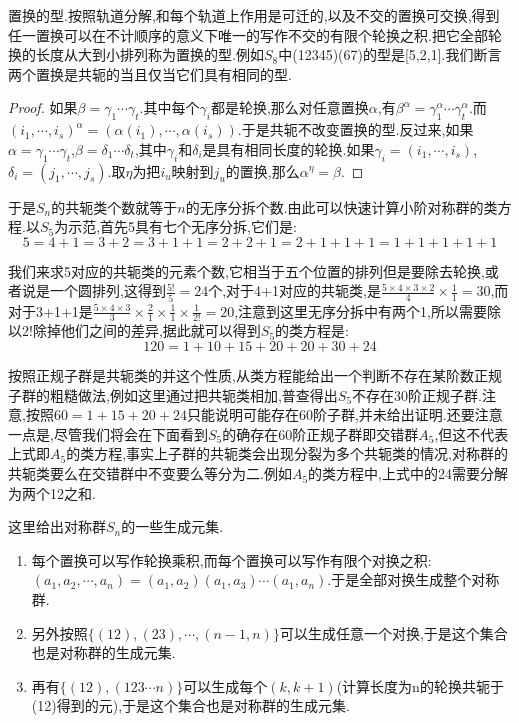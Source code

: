 置换的型.按照轨道分解,和每个轨道上作用是可迁的,以及不交的置换可交换,得到任一置换可以在不计顺序的意义下唯一的写作不交的有限个轮换之积.把它全部轮换的长度从大到小排列称为置换的型.例如$S_8$中(12345)(67)的型是[5,2,1].我们断言两个置换是共轭的当且仅当它们具有相同的型.
\begin{proof}
	
	如果$\beta=\gamma_1\cdots\gamma_t$.其中每个$\gamma_i$都是轮换,那么对任意置换$\alpha$,有$\beta^ {\alpha}=\gamma_1^{\alpha}\cdots\gamma_t^{\alpha}$.而$(i_1,\cdots,i_s)^{\alpha}=(\alpha(i_1),\cdots,\alpha(i_s))$.于是共轭不改变置换的型.反过来,如果$\alpha=\gamma_1\cdots \gamma_t$,$\beta=\delta_1\cdots\delta_t$,其中$\gamma_i$和$\delta_i$是具有相同长度的轮换.如果$\gamma_i= (i_1,\cdots,i_s)$,$\delta_i=(j_1,\cdots,j_s)$.取$\eta$为把$i_u$映射到$j_u$的置换,那么$\alpha^{\eta}=\beta$.
\end{proof}

于是$S_n$的共轭类个数就等于$n$的无序分拆个数.由此可以快速计算小阶对称群的类方程.以$S_5$为示范,首先5具有七个无序分拆,它们是:
$$5=4+1=3+2=3+1+1=2+2+1=2+1+1+1=1+1+1+1+1$$

我们来求5对应的共轭类的元素个数,它相当于五个位置的排列但是要除去轮换,或者说是一个圆排列,这得到$\frac{5!}{5}=24$个,对于4+1对应的共轭类,是$\frac{5\times 4\times 3\times 2}{4}\times\frac{1}{1}=30$,而对于3+1+1是$\frac{5\times 4\times 3}{3}\times\frac{2}{1}\times\frac{1}{1}\times\frac{1}{2!}=20$,注意到这里无序分拆中有两个1,所以需要除以$2!$除掉他们之间的差异,据此就可以得到$S_5$的类方程是:
$$120=1+10+15+20+20+30+24$$

按照正规子群是共轭类的并这个性质,从类方程能给出一个判断不存在某阶数正规子群的粗糙做法,例如这里通过把共轭类相加,普查得出$S_5$不存在30阶正规子群.注意,按照$60=1+15+20+24$只能说明可能存在60阶子群,并未给出证明.还要注意一点是,尽管我们将会在下面看到$S_5$的确存在60阶正规子群即交错群$A_5$,但这不代表上式即$A_5$的类方程,事实上子群的共轭类会出现分裂为多个共轭类的情况,对称群的共轭类要么在交错群中不变要么等分为二.例如$A_5$的类方程中,上式中的24需要分解为两个12之和.

这里给出对称群$S_n$的一些生成元集.
\begin{enumerate}
	\item 每个置换可以写作轮换乘积,而每个置换可以写作有限个对换之积:$(a_1,a_2,\cdots,a_n)=(a_1,a_2)(a_1,a_3)\cdots(a_1,a_n)$.于是全部对换生成整个对称群.
	\item 另外按照$\{(12),(23),\cdots,(n-1,n)\}$可以生成任意一个对换,于是这个集合也是对称群的生成元集.
	\item 再有$\{(12),(123\cdots n)\}$可以生成每个$(k,k+1)$(计算长度为n的轮换共轭于(12)得到的元),于是这个集合也是对称群的生成元集.
\end{enumerate}

